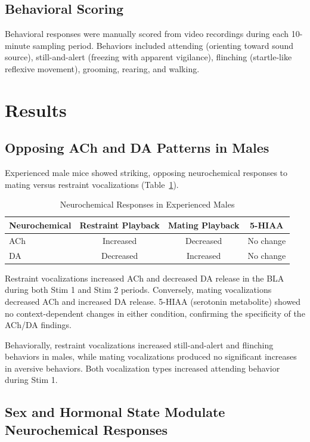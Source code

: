 \documentclass[11pt]{article}
\begin{document}
\subsection{Behavioral Scoring}

Behavioral responses were manually scored from video recordings during each 10-minute sampling period. Behaviors included attending (orienting toward sound source), still-and-alert (freezing with apparent vigilance), flinching (startle-like reflexive movement), grooming, rearing, and walking.

\section{Results}

\subsection{Opposing ACh and DA Patterns in Males}

Experienced male mice showed striking, opposing neurochemical responses to mating versus restraint vocalizations (Table~\ref{tab:male_neuro}).

\begin{table}[ht]
\centering
\caption{Neurochemical Responses in Experienced Males}
\label{tab:male_neuro}
\begin{tabular}{lccc}
\toprule
\textbf{Neurochemical} & \textbf{Restraint Playback} & \textbf{Mating Playback} & \textbf{5-HIAA} \\
\midrule
ACh & Increased & Decreased & No change \\
DA & Decreased & Increased & No change \\
\bottomrule
\end{tabular}
\end{table}

Restraint vocalizations increased ACh and decreased DA release in the BLA during both Stim 1 and Stim 2 periods. Conversely, mating vocalizations decreased ACh and increased DA release. 5-HIAA (serotonin metabolite) showed no context-dependent changes in either condition, confirming the specificity of the ACh/DA findings.

Behaviorally, restraint vocalizations increased still-and-alert and flinching behaviors in males, while mating vocalizations produced no significant increases in aversive behaviors. Both vocalization types increased attending behavior during Stim 1.

\subsection{Sex and Hormonal State Modulate Neurochemical Responses}
\end{document}
